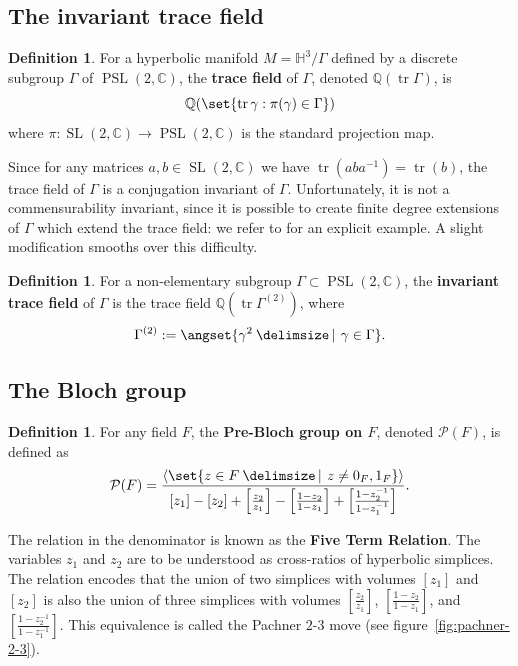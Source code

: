 \documentclass[10pt]{amsart}
\numberwithin{equation}{theorem}
\theoremstyle{definition}
\newtheorem{definition}[theorem]{Definition}
\newcommand{\definedterm}[1]{\textbf{#1}}
\providecommand\given{}
\newcommand\SetSymbol[1][]{%
  \nonscript\:#1\,\vert\,\allowbreak\nonscript\:\mathopen{}}
\renewcommand\given{\SetSymbol[\delimsize]}
\renewcommand\given{\SetSymbol[\delimsize]}
\DeclareMathOperator{\tr}{tr} \DeclareMathOperator{\vol}{vol}
\newcommand{\PSL}{\operatorname{PSL}}
\newcommand{\SL}{\operatorname{SL}}
\newcommand{\invtracefield}[1]{\mathbb{Q}(\tr #1^{(2)})}
\newcommand{\prebloch}[1]{\mathcal{P}(#1)}
\newcommand{\tracefield}[1]{\mathbb{Q}(\tr #1)}
\begin{document}
\subsection{The invariant trace field}

\begin{definition}
  For a hyperbolic manifold $M = \mathbb{H}^3 / \Gamma$ defined by a
  discrete subgroup $\Gamma$ of $\PSL(2, \mathbb{C})$, the
  \definedterm{trace field} of $\Gamma$, denoted
  $\tracefield{\Gamma}$, is
  \[ \mathbb{Q}( \set{ \tr \gamma : \pi(\gamma) \in \Gamma } ) \]
  where $\pi: \SL(2, \mathbb{C}) \to \PSL(2, \mathbb{C})$ is the
  standard projection map.
\end{definition}

Since for any matrices $a, b \in \SL(2, \mathbb{C})$ we have
$\tr (aba^{-1}) = \tr(b)$, the trace field of $\Gamma$ is a
conjugation invariant of $\Gamma$. Unfortunately, it is not a
commensurability invariant, since it is possible to create finite
degree extensions of $\Gamma$ which extend the trace field: we refer
to \parencite[116]{maclachlanreid} for an explicit example. A slight
modification smooths over this difficulty.

\begin{definition}
  For a non-elementary subgroup $\Gamma \subset \PSL(2, \mathbb{C})$,
  the \definedterm{invariant trace field} of $\Gamma$ is the trace
  field $\invtracefield{\Gamma}$, where
  \[ \Gamma^{(2)} := \angset{ \gamma^2 \given \gamma \in \Gamma }. \]
\end{definition}

\subsection{The Bloch group}
\label{subsec:bloch-group}


\begin{definition}
  For any field $F$, the \definedterm{Pre-Bloch group on $F$}, denoted
  $\prebloch{F}$, is defined as
    \[ \prebloch{F} = \frac{\langle \set{z \in F
          \given z \ne 0_F, 1_F} \rangle}{[z_1] - [z_2] +
        \left[\frac{z_2}{z_1}\right] - \left[\frac{1 - z_2}{1 -
            z_1}\right] + \left[ \frac{1 - z_2^{-1}}{1 -
            z_1^{-1}}\right]}. \]
  \end{definition}

  The relation in the denominator is known as the \definedterm{Five
    Term Relation}. The variables $z_1$ and $z_2$ are to be understood
  as cross-ratios of hyperbolic simplices. The relation encodes that
  the union of two simplices with volumes $[z_1]$ and $[z_2]$ is also
  the union of three simplices with volumes $[\frac{z_2}{z_1}]$,
  $[\frac{1 - z_2}{1 - z_1}]$, and
  $[ \frac{1 - z_2^{-1}}{1 - z_1^{-1}}]$. This equivalence is called
  the Pachner $2$-$3$ move (see figure~\ref{fig:pachner-2-3}).
\end{document}
